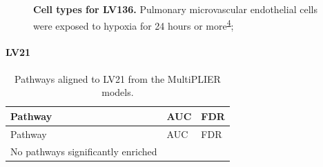 \documentclass[
  a4paper,
]{article}
\newenvironment{fignos:tagged-figure}[1][]{
  \let\oldfigurename\figurename
  \renewcommand{\figurename}{Supplementary Figure}
}{
  \let\figurename\oldfigurename
}
\newenvironment{tablenos:tagged-table}[1][]{
  \let\oldtablename\tablename
  \renewcommand{\tablename}{Supplementary Table}
}{
  \let\tablename\oldtablename
}
\begin{document}
\begin{fignos:tagged-figure}[S23]

\begin{figure}
\hypertarget{fig:sup:lv136}{%
\centering

\caption{\textbf{Cell types for LV136.}
Pulmonary microvascular endothelial cells were exposed to hypoxia for 24 hours or more\textsuperscript{\protect\hyperlink{ref-VKYS05n1}{4}};}\label{fig:sup:lv136}
}
\end{figure}

\end{fignos:tagged-figure}

\clearpage

\hypertarget{lv21}{%
\paragraph{LV21}\label{lv21}}

\begin{tablenos:tagged-table}[S33]

\begin{longtable}[]{@{}lll@{}}
\caption{Pathways aligned to LV21 from the MultiPLIER models.
\label{tbl:sup:multiplier_pathways:lv21}}\label{tbl:sup:multiplier_pathways:lv21}\tabularnewline
\toprule()
Pathway & AUC & FDR \\
\midrule()
\endfirsthead
\toprule()
Pathway & AUC & FDR \\
\midrule()
\endhead
No pathways significantly enriched & & \\
\bottomrule()
\end{longtable}

\end{tablenos:tagged-table}
\end{document}
